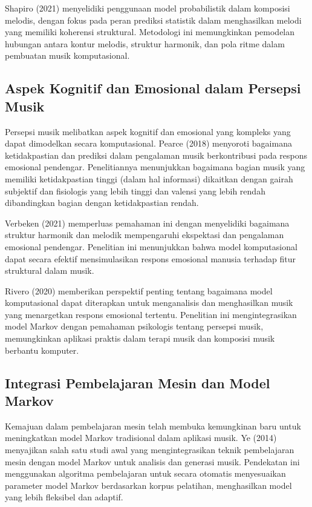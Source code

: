 \documentclass[a4paper,12pt]{article}
\begin{document}
Shapiro (2021) menyelidiki penggunaan model probabilistik dalam komposisi melodis, dengan fokus pada peran prediksi statistik dalam menghasilkan melodi yang memiliki koherensi struktural. Metodologi ini memungkinkan pemodelan hubungan antara kontur melodis, struktur harmonik, dan pola ritme dalam pembuatan musik komputasional.

\subsection*{Aspek Kognitif dan Emosional dalam Persepsi Musik}

Persepsi musik melibatkan aspek kognitif dan emosional yang kompleks yang dapat dimodelkan secara komputasional. Pearce (2018) menyoroti bagaimana ketidakpastian dan prediksi dalam pengalaman musik berkontribusi pada respons emosional pendengar. Penelitiannya menunjukkan bagaimana bagian musik yang memiliki ketidakpastian tinggi (dalam hal informasi) dikaitkan dengan gairah subjektif dan fisiologis yang lebih tinggi dan valensi yang lebih rendah dibandingkan bagian dengan ketidakpastian rendah.

Verbeken (2021) memperluas pemahaman ini dengan menyelidiki bagaimana struktur harmonik dan melodik mempengaruhi ekspektasi dan pengalaman emosional pendengar. Penelitian ini menunjukkan bahwa model komputasional dapat secara efektif mensimulasikan respons emosional manusia terhadap fitur struktural dalam musik.

Rivero (2020) memberikan perspektif penting tentang bagaimana model komputasional dapat diterapkan untuk menganalisis dan menghasilkan musik yang menargetkan respons emosional tertentu. Penelitian ini mengintegrasikan model Markov dengan pemahaman psikologis tentang persepsi musik, memungkinkan aplikasi praktis dalam terapi musik dan komposisi musik berbantu komputer.

\subsection*{Integrasi Pembelajaran Mesin dan Model Markov}

Kemajuan dalam pembelajaran mesin telah membuka kemungkinan baru untuk meningkatkan model Markov tradisional dalam aplikasi musik. Ye (2014) menyajikan salah satu studi awal yang mengintegrasikan teknik pembelajaran mesin dengan model Markov untuk analisis dan generasi musik. Pendekatan ini menggunakan algoritma pembelajaran untuk secara otomatis menyesuaikan parameter model Markov berdasarkan korpus pelatihan, menghasilkan model yang lebih fleksibel dan adaptif.
\end{document}
